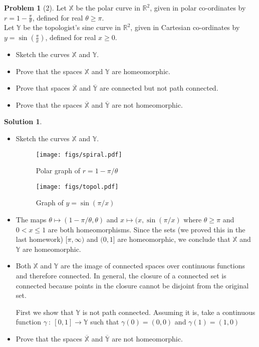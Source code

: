 \documentclass{article}
\theoremstyle{definition}
\newtheorem*{soln}{Solution}
\newtheorem*{prob}{Problem}
\theoremstyle{theorem}
\newcommand{\X}{\mathbb{X}}
\newcommand{\Y}{\mathbb{Y}}
\begin{document}
\begin{prob}[2]
Let $\mathbb{X}$ be the polar curve in $\mathbb{R}^2$, given in polar co-ordinates by $\displaystyle{r = 1 - \frac{\pi}{\theta}}$, defined for real $\theta \ge \pi$.  \\Let $\mathbb{Y}$ be the topologist's sine curve in $\mathbb{R}^2$, given in Cartesian co-ordinates by  $\displaystyle{y = \sin\left(\frac{\pi}{x}\right)}$, defined for real $x\ge 0$.  
\begin{itemize}\item Sketch the curves $\mathbb{X}$ and $\mathbb{Y}$.
\item Prove that the spaces   $\mathbb{X}$ and $\mathbb{Y}$ are homeomorphic.
\item Prove that spaces $\overline{\mathbb{X}}$ and $\overline{\mathbb{Y}}$ are connected but not path connected.
\item Prove that the spaces $\overline{\mathbb{X}}$ and $\overline{\mathbb{Y}}$ are not homeomorphic.
\end{itemize}
\end{prob}
\begin{soln}
\begin{itemize}\item Sketch the curves $\mathbb{X}$ and $\mathbb{Y}$.
            \begin{figure}
  \centering
    \texttt{[image: figs/spiral.pdf]}
  \caption{Polar graph of $r=1- \pi/\theta$}
\end{figure}
            \begin{figure}
  \centering
    \texttt{[image: figs/topol.pdf]}
                \caption{Graph of $y = \sin(\pi/x)$}
\end{figure}
        \item The maps $\theta \mapsto (1-\pi/\theta, \theta)$ and $x \mapsto (x,\sin(\pi/x)$ where $\theta\geq \pi$ and $0<x\leq 1$ are both homeomorphisms. Since the sets (we proved this in the last homework) $[\pi,\infty)$ and $(0,1]$ are homeomorphic, we conclude that $\X$ and $\Y$ are homeomorphic.
\item Both $\X$ and $\Y$ are the image of connected spaces over continuous functions and therefore connected. In general, the closure of a connected set is connected because points in the closure cannot be disjoint from the original set. 

    First we show that $\Y$ is not path connected. Assuming it is, take a continuous function $\gamma\ :\ [0,1]\to \Y$ such that $\gamma(0) = (0,0)$ and $\gamma(1) = (1, 0)$

\item Prove that the spaces $\overline{\mathbb{X}}$ and $\overline{\mathbb{Y}}$ are not homeomorphic.
\end{itemize}

\end{soln}
\vspace{1in}
\end{document}

